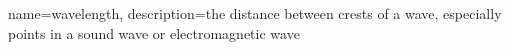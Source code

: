 {
    name=wavelength,
    description={the distance between crests of a wave, especially points in a sound wave or electromagnetic wave}
} 
